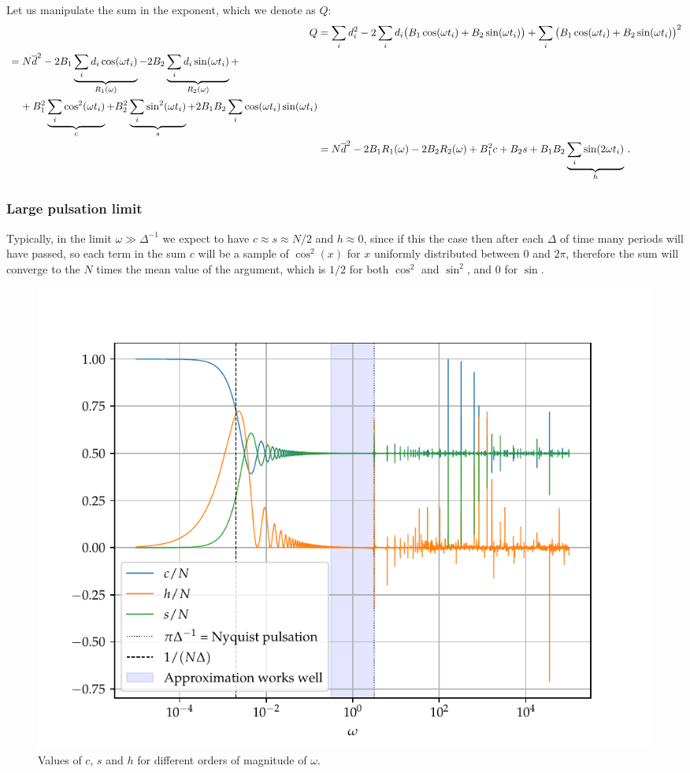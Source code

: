 \documentclass[main.tex]{subfiles}
\begin{document}
Let us manipulate the sum in the exponent, which we denote as \(Q\): 
%
\begin{align}
Q &= \sum _{i} d_i^2 -2 \sum _i d_i \qty(B_1  \cos(\omega t_i) + B_2 \sin(\omega t_i))
+ \sum _{i} \qty(B_1  \cos(\omega t_i) + B_2 \sin(\omega t_i))^2  \\
\begin{split}
&= N \overline{d}^2 
-2 B_1 \underbrace{\sum _{i} d_i \cos(\omega t_i)}_{R_1(\omega )}
-2 B_2 \underbrace{\sum _{i} d_i \sin(\omega t_i)}_{R_2(\omega )} + \\
&\phantom{=}\ 
+ B_1^2 \underbrace{\sum _{i} \cos^2( \omega t_i)}_{c}
+ B_2^2 \underbrace{\sum _{i} \sin^2( \omega t_i)}_{s}
+ 2 B_1 B_2 \sum _{i} \cos(\omega t_i) \sin(\omega t_i) 
\end{split}  \\
&= N \overline{d}^2 - 2 B_1 R_1(\omega ) -2 B_2 R_2(\omega ) + B_1^2 c + B_2 s + B_1 B_2 \underbrace{\sum _{i} \sin(2 \omega t_i)}_{h}
\,.
\end{align}

\subsubsection{Large pulsation limit}

Typically, in the limit \(\omega \gg \Delta^{-1} \) we expect to have \(c \approx s \approx N/2\) and \(h \approx 0\), since if this the case then after each \(\Delta \) of time many periods will have passed, so each term in the sum \(c\) will be a sample of \(\cos^2(x)\) for \(x\) uniformly distributed between \(0\) and \(2 \pi \), therefore the sum will converge to the \(N\) times the mean value of the argument, which is \(1/2\) for both \(\cos^2\) and \(\sin^2\), and \(0\) for \(\sin\).

\begin{figure}[ht]
\centering
\includegraphics[width=\textwidth]{figures/large_pulsation}
\caption{Values of \(c\), \(s\) and \(h\) for different orders of magnitude of \(\omega \).}
\label{fig:large_pulsation}
\end{figure}
\end{document}
